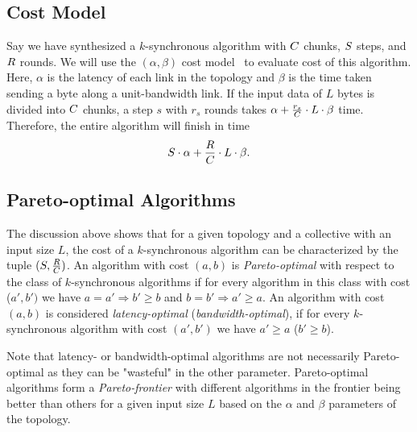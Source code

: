 \subsection{Cost Model}
\label{sec:costmodel}
Say we have synthesized a $k$-synchronous algorithm with $C$
chunks, $S$ steps, and $R$ rounds. We will use the
$(\alpha, \beta)$ cost model~\cite{hockney1994communication} to
evaluate cost of this algorithm. Here, $\alpha$ is the latency of each
link in the topology and $\beta$ is the time taken sending a byte
along a unit-bandwidth link. If the input data of $L$ bytes is divided
into $C$ chunks, a step $s$ with $r_s$ rounds takes $\alpha +
\frac{r_s}{C}\cdot L \cdot \beta$ time. Therefore, the entire
algorithm will finish in time
$$ S \cdot \alpha + \frac{R}{C} \cdot L \cdot \beta. $$

\subsection{Pareto-optimal Algorithms}
\label{sec:pareto:optimal}
The discussion above shows that for a given topology and a collective
with an input size $L$, the cost of a $k$-synchronous algorithm can be
characterized by the tuple $(S, \frac{R}{C})$. An
algorithm with cost $(a,b)$ is {\em Pareto-optimal} with respect to
the class of $k$-synchronous algorithms if for every algorithm in this
class with cost  ($a', b')$ we have $a = a' \Rightarrow b' \geq b$ and
$b = b' \Rightarrow a' \geq a$. An algorithm with cost $(a,b)$ is
considered {\em latency-optimal} ({\em bandwidth-optimal}), if for
every $k$-synchronous algorithm with cost $(a',b')$ we have $a' \geq
a$ ($b' \geq b$).

Note that latency- or bandwidth-optimal algorithms are not necessarily
Pareto-optimal as they can be "wasteful" in the other parameter.
Pareto-optimal algorithms form a {\em Pareto-frontier} with different
algorithms in the frontier being better than others for a given input
size $L$ based on the $\alpha$ and $\beta$ parameters of the topology.

